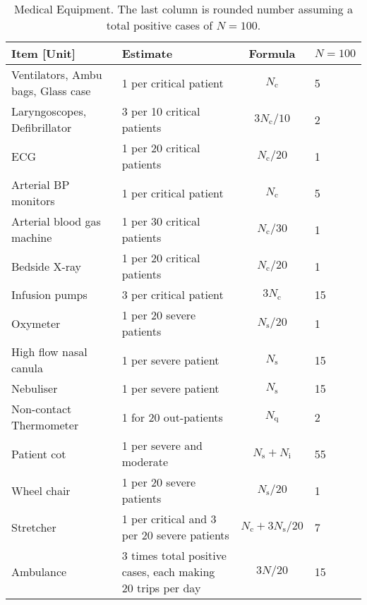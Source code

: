 \documentclass{article}
\newcommand{\nc}{\ensuremath{N_{\mathrm{c}}}}
\newcommand{\ns}{\ensuremath{N_{\mathrm{s}}}}
\newcommand{\nin}{\ensuremath{N_{\mathrm{i}}}}
\newcommand{\nq}{\ensuremath{N_{\mathrm{q}}}}
\begin{document}
\begin{landscape}
\begin{table}
  \caption{Medical Equipment. The last column is
    rounded number assuming a total positive cases of $N=100$.}
  \begin{tabularx}{\linewidth}{XXcl}
    \toprule
    Item [Unit] & Estimate & Formula & $N=100$\\
    \midrule
    Ventilators, Ambu bags, Glass case & 1 per critical patient&
    $\nc$ & 5 \\
    Laryngoscopes, Defibrillator & 3 per 10 critical patients &
    $3 \nc/10$ & 2 \\
    ECG & 1 per 20 critical patients& $\nc/20$ & 1\\
    Arterial BP monitors & 1 per critical patient &
    $\nc$ & 5 \\
    Arterial blood gas machine & 1 per 30 critical patients &
    $\nc/30$ & 1 \\
    Bedside X-ray & 1 per 20 critical patients & $\nc/20$ & 1\\
    Infusion pumps & 3 per critical patient & $3 \nc$ & 15 \\
    Oxymeter &  1 per 20 severe patients & $\ns/20$ & 1\\
    High flow nasal canula & 1 per severe patient & $\ns$ & 15\\
    Nebuliser & 1 per severe patient & $\ns$ & 15\\
    Non-contact Thermometer & 1 for 20 out-patients & $\nq$ & 2\\
    Patient cot & 1 per severe and moderate & $\ns+\nin$ & 55 \\
    Wheel chair & 1 per 20 severe patients & $\ns/20$ & 1\\
    Stretcher & 1 per critical and 3 per 20 severe patients &
    $\nc + 3 \ns/20$ & 7\\
    Ambulance &  3 times total positive cases, each making 20 trips
    per day & $3 N / 20$ & 15\\
\bottomrule
\end{tabularx}
\end{table}
\end{landscape}
\end{document}
